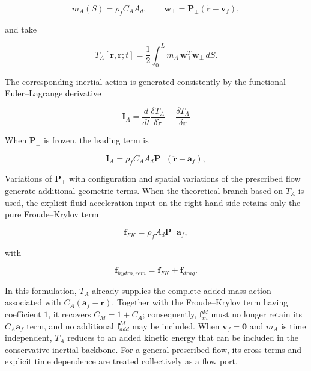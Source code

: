 \begin{equation}
\label{eq:rod-1-56}
m_{A}(S) = \rho_{f}C_{A}A_{d},\quad\quad\mathbf{w}_{\bot} = \mathbf{P}_{\bot}\left( \dot{\mathbf{r}} - \mathbf{v}_{f} \right),
\end{equation}

and take

\begin{equation}
\label{eq:rod-1-57}
T_{A}\left\lbrack \mathbf{r},\dot{\mathbf{r}};t \right\rbrack = \frac{1}{2}\int_{0}^{L}m_{A}\,\mathbf{w}_{\bot}^{T}\mathbf{w}_{\bot}\, dS.
\end{equation}

The corresponding inertial action is generated consistently by the functional Euler--Lagrange derivative

\begin{equation}
\label{eq:rod-1-58}
\mathbf{I}_{A} = \frac{d}{dt}\frac{\delta T_{A}}{\delta\dot{\mathbf{r}}} - \frac{\delta T_{A}}{\delta\mathbf{r}}
\end{equation}

When \(\mathbf{P}_{\bot}\) is frozen, the leading term is

\begin{equation}
\label{eq:rod-1-59}
\mathbf{I}_{A} = \rho_{f}C_{A}A_{d}\mathbf{P}_{\bot}\left( \ddot{\mathbf{r}} - \mathbf{a}_{f} \right),
\end{equation}

Variations of \(\mathbf{P}_{\bot}\) with configuration and spatial variations of the prescribed flow generate additional geometric terms. When the theoretical branch based on \(T_{A}\) is used, the explicit fluid-acceleration input on the right-hand side retains only the pure Froude--Krylov term

\begin{equation}
\label{eq:rod-1-60}
\boxed{\mathbf{f}_{FK} = \rho_{f}A_{d}\mathbf{P}_{\bot}\mathbf{a}_{f}},
\end{equation}

with

\begin{equation}
\label{eq:rod-1-61}
\mathbf{f}_{hydro,rem} = \mathbf{f}_{FK} + \mathbf{f}_{drag}.
\end{equation}

In this formulation, \(T_{A}\) already supplies the complete added-mass action associated with \(C_{A}\left( \mathbf{a}_{f} - \ddot{\mathbf{r}} \right)\). Together with the Froude--Krylov term having coefficient \(1\), it recovers \(C_{M} = 1 + C_{A}\); consequently, \(\mathbf{f}_{in}^{M}\) must no longer retain its \(C_{A}\mathbf{a}_{f}\) term, and no additional \(\mathbf{f}_{add}^{M}\) may be included. When \(\mathbf{v}_{f} = \mathbf{0}\) and \(m_{A}\) is time independent, \(T_{A}\) reduces to an added kinetic energy that can be included in the conservative inertial backbone. For a general prescribed flow, its cross terms and explicit time dependence are treated collectively as a flow port.

